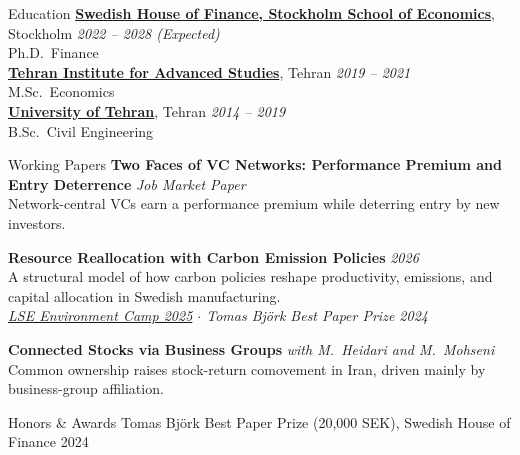 \documentclass{resume}
\begin{document}
\begin{rSection}{Education}
  \vspace{-2pt}
  {\bf \href{https://www.hhs.se/en/houseoffinance/}{Swedish House of Finance, Stockholm School of Economics}}, Stockholm \hfill {\em 2022 -- 2028 (Expected)} \\
  Ph.D.\ Finance  \\[5pt]
  {\bf \href{https://teias.institute/}{Tehran Institute for Advanced Studies}}, Tehran \hfill {\em 2019 -- 2021} \\
  M.Sc.\ Economics \\[5pt]
  {\bf \href{https://www.ut.ac.ir/en}{University of Tehran}}, Tehran \hfill {\em 2014 -- 2019} \\
  B.Sc.\ Civil Engineering
\end{rSection}

\begin{rSection}{Working Papers}
  \vspace{2pt}
  {\bf Two Faces of VC Networks: Performance Premium and Entry Deterrence} \hfill {\em Job Market Paper} \\[-2pt]
  {\small Network-central VCs earn a performance premium while deterring entry by new investors.}
  \vspace{4pt}

  {\bf Resource Reallocation with Carbon Emission Policies} \hfill {\em 2026} \\[-2pt]
  {\small A structural model of how carbon policies reshape productivity, emissions, and capital allocation in Swedish manufacturing.} \\[0pt]
  {\small {\em \href{https://www.lse-environment-week.com/environment-camp-2025}{LSE Environment Camp 2025} $\cdot$ Tomas Bj\"{o}rk Best Paper Prize 2024}}
  \vspace{4pt}

  {\bf Connected Stocks via Business Groups} \hfill {\em with M.\ Heidari and M.\ Mohseni} \\[-2pt]
  {\small Common ownership raises stock-return comovement in Iran, driven mainly by business-group affiliation.}
\end{rSection}

\begin{rSection}{Honors \& Awards}
  \vspace{-2pt}
  Tomas Bj\"{o}rk Best Paper Prize (20,000 SEK), Swedish House of Finance \hfill {2024}
\end{rSection}
\end{document}
